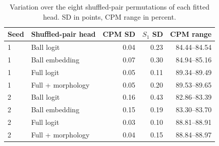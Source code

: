 \begin{table}[!t]
\centering
\small
\caption{Variation over the eight shuffled-pair permutations of each fitted head. SD in points, CPM range in percent.}
\label{tab:sham_spread}
\begin{tabular}{@{}llrrr@{}}
\toprule
Seed & Shuffled-pair head & CPM SD & $S_1$ SD & CPM range \\
\midrule
1 & Ball logit & 0.04 & 0.23 & 84.44--84.54 \\
1 & Ball embedding & 0.07 & 0.30 & 84.94--85.16 \\
1 & Full logit & 0.05 & 0.11 & 89.34--89.49 \\
1 & Full + morphology & 0.05 & 0.20 & 89.53--89.65 \\
2 & Ball logit & 0.16 & 0.43 & 82.86--83.39 \\
2 & Ball embedding & 0.15 & 0.19 & 83.30--83.70 \\
2 & Full logit & 0.03 & 0.10 & 88.81--88.91 \\
2 & Full + morphology & 0.04 & 0.15 & 88.84--88.97 \\
\bottomrule
\end{tabular}
\end{table}
